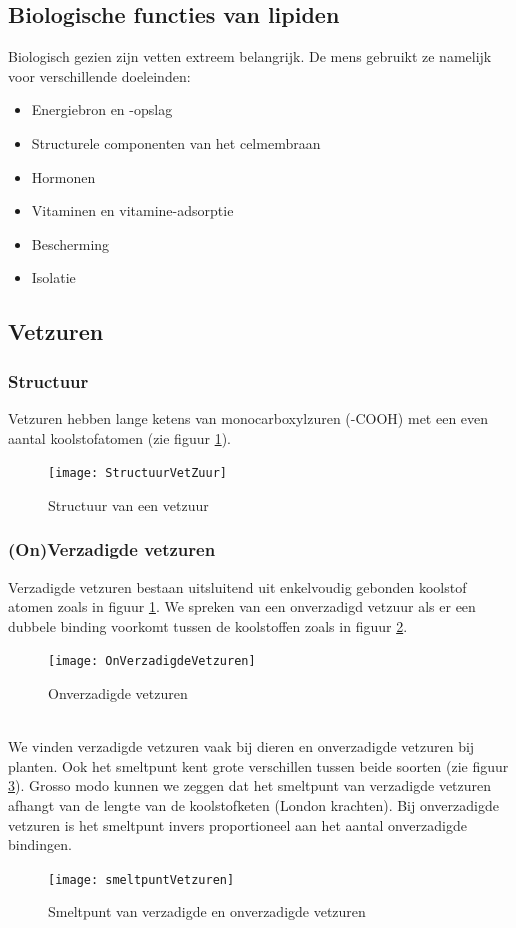 \documentclass[a4paper,kul]{kulakarticle} %
\begin{document}
\subsection{Biologische functies van lipiden}
Biologisch gezien zijn vetten extreem belangrijk. De mens gebruikt ze namelijk voor verschillende doeleinden:
\begin{itemize}
	\item Energiebron en -opslag
	\item Structurele componenten van het celmembraan
	\item Hormonen
	\item Vitaminen en vitamine-adsorptie
	\item Bescherming
	\item Isolatie
\end{itemize}
\subsection{Vetzuren}
\subsubsection{Structuur}
Vetzuren hebben lange ketens van monocarboxylzuren (-COOH) met een even aantal koolstofatomen (zie figuur \ref{fig:structuurvetzuur}).
\begin{figure}[h]
	\centering
	\texttt{[image: StructuurVetZuur]}
	\caption[Vetzuur]{Structuur van een vetzuur}
	\label{fig:structuurvetzuur}
\end{figure}
\subsubsection{(On)Verzadigde vetzuren}
Verzadigde vetzuren bestaan uitsluitend uit enkelvoudig gebonden koolstof atomen zoals in figuur \ref{fig:structuurvetzuur}. We spreken van een onverzadigd vetzuur als er een dubbele binding voorkomt tussen de koolstoffen zoals in figuur \ref{fig:onverzadigdevetzuren}.
\begin{figure}[h]
	\centering
	\texttt{[image: OnVerzadigdeVetzuren]}
	\caption[Onverzadigde VZ]{Onverzadigde vetzuren}
	\label{fig:onverzadigdevetzuren}
\end{figure}\\
We vinden verzadigde vetzuren vaak bij dieren en onverzadigde vetzuren bij planten. Ook het smeltpunt kent grote verschillen tussen beide soorten (zie figuur \ref{fig:smeltpuntvetzuren}). Grosso modo kunnen we zeggen dat het smeltpunt van verzadigde vetzuren afhangt van de lengte van de koolstofketen (London krachten). Bij onverzadigde vetzuren is het smeltpunt invers proportioneel aan het aantal onverzadigde bindingen. 
\begin{figure}[h]
	\centering
	\texttt{[image: smeltpuntVetzuren]}
	\caption[Smeltpunt]{Smeltpunt van verzadigde en onverzadigde vetzuren}
	\label{fig:smeltpuntvetzuren}
\end{figure}
\end{document}
